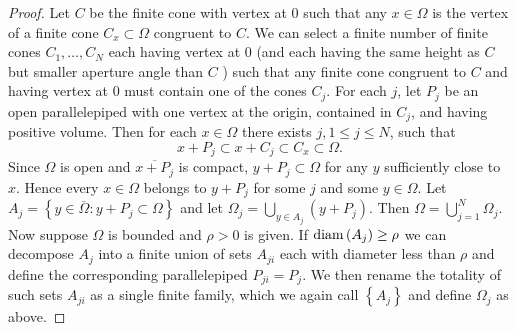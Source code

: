 \begin{proof}
  Let $C$ be the finite cone with vertex at 0 such that any $x \in \Omega$ is the vertex of a finite
  cone $C_x \subset \Omega$ congruent to $C$. We can select a finite number of finite cones
  $C_1, \ldots, C_N$ each having vertex at 0 (and each having the same height as $C$ but smaller
  aperture angle than $C$ ) such that any finite cone congruent to $C$ and having vertex at 0
  must contain one of the cones $C_j$. For each $j$, let $P_j$ be an open parallelepiped with
  one vertex at the origin, contained in $C_j$, and having positive volume.
  Then for each $x \in \Omega$ there exists $j, 1 \leq j \leq N$, such that
  \[
  x+P_j \subset x+C_j \subset C_x \subset \Omega .
  \]
  Since $\Omega$ is open and $\overline{x+P_j}$ is compact, $y+P_j \subset \Omega$ for any $y$
  sufficiently close to $x$. Hence every $x \in \Omega$ belongs to $y+P_j$ for some $j$ and some $y \in \Omega$. 
  Let $A_j=\left\{y \in \overline{\Omega}: y+P_j \subset \Omega\right\}$ and
  let $\Omega_j=\bigcup_{y \in A_j}\left(y+P_j\right)$. Then $\Omega=\bigcup_{j=1}^N \Omega_j$.
  Now suppose $\Omega$ is bounded and $\rho>0$ is given. If $\operatorname{diam}\left(A_j\right) \geq \rho$
  we can decompose $A_j$ into a finite union of sets $A_{j i}$ each with diameter less than $\rho$
  and define the corresponding parallelepiped $P_{j i}=P_j$. We then rename the totality of such
  sets $A_{j i}$ as a single finite family, which we again call $\left\{A_j\right\}$ and
  define $\Omega_j$ as above.
  

\end{proof}
